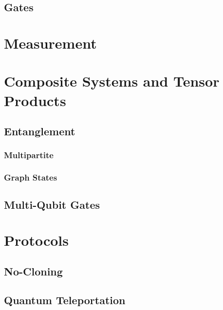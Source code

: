 		\subsection{Gates} %

	\section{Measurement} %

	\section{Composite Systems and Tensor Products} %

		\subsection{Entanglement} %

			\subsubsection{Multipartite} %

			\subsubsection{Graph States} %

		\subsection{Multi-Qubit Gates} %

	\section{Protocols} %

		\subsection{No-Cloning} %

		\subsection{Quantum Teleportation} %

